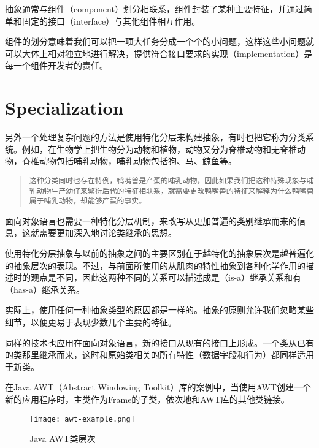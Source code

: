 抽象通常与组件（component）划分相联系，组件封装了某种主要特征，并通过简单和固定的接口（interface）与其他组件相互作用。

组件的划分意味着我们可以把一项大任务分成一个个的小问题，这样这些小问题就可以大体上相对独立地进行解决，提供符合接口要求的实现（implementation）是每一个组件开发者的责任。

\section{Specialization}



另外一个处理复杂问题的方法是使用特化分层来构建抽象，有时也把它称为分类系统。例如，在生物学上把生物分为动物和植物，动物又分为脊椎动物和无脊椎动物，脊椎动物包括哺乳动物，哺乳动物包括狗、马、鲸鱼等。

\begin{quote}
\texttt{这种分类同时也存在特例，鸭嘴兽是产蛋的哺乳动物，因此如果我们把这种特殊现象与哺乳动物生产幼仔来繁衍后代的特征相联系，就需要更改鸭嘴兽的特征来解释为什么鸭嘴兽属于哺乳动物，却能够产蛋的事实。}
\end{quote}






面向对象语言也需要一种特化分层机制，来改写从更加普遍的类别继承而来的信息，这就需要更加深入地讨论类继承的思想。

使用特化分层抽象与以前的抽象之间的主要区别在于越特化的抽象层次是越普遍化的抽象层次的表现。不过，与前面所使用的从肌肉的特性抽象到各种化学作用的描述时的观点是不同，因此这两种不同的关系可以描述成是（is-a）继承关系和有（has-a）继承关系。

实际上，使用任何一种抽象类型的原因都是一样的。抽象的原则允许我们忽略某些细节，以便更易于表现少数几个主要的特征。



同样的技术也应用在面向对象语言，新的接口从现有的接口上形成。一个类从已有的类那里继承而来，这时和原始类相关的所有特性（数据字段和行为）都同样适用于新类。




在Java AWT（Abstract Windowing Toolkit）库的案例中，当使用AWT创建一个新的应用程序时，主类作为Frame的子类，依次地和AWT库的其他类链接。

\begin{figure}[htbp]
\centering
\texttt{[image: awt-example.png]}
\caption{Java AWT类层次}
\label{fig:java-awt-example}
\end{figure}

